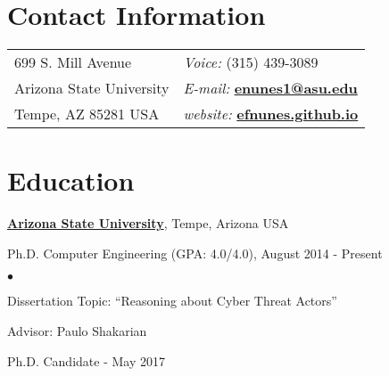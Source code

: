 \documentclass[margin,line]{CV}
\newenvironment{list1}{
  \begin{list}{\ding{113}}{%
      \setlength{\itemsep}{0in}
      \setlength{\parsep}{0in} \setlength{\parskip}{0in}
      \setlength{\topsep}{0in} \setlength{\partopsep}{0in} 
      \setlength{\leftmargin}{0.17in}}}{\end{list}}
\newenvironment{list2}{
  \begin{list}{$\bullet$}{%
      \setlength{\itemsep}{0in}
      \setlength{\parsep}{0in} \setlength{\parskip}{0in}
      \setlength{\topsep}{0in} \setlength{\partopsep}{0in} 
      \setlength{\leftmargin}{0.2in}}}{\end{list}}
\begin{document}

\begin{resume}
\section{\sc Contact Information}
\vspace{.05in}
\begin{tabular}{@{}p{2in}p{4in}}
699 S. Mill Avenue            & {\it Voice:}  (315) 439-3089\\                    
Arizona State University & {\it E-mail:}  \href{mailto:enunes1@asu.edu}{\bf enunes1@asu.edu}\\       
Tempe, AZ  85281 USA  & {\it website:} \href{https://efnunes.github.io/}{\bf efnunes.github.io} \\     
\end{tabular}



\section{\sc Education}
\href{http://www.asu.edu/}{\bf Arizona State University}, Tempe, Arizona USA\\
\vspace*{-.1in}
\begin{list1}
\item[] Ph.D. Computer Engineering (GPA: 4.0/4.0), August 2014 - Present
\begin{list2}
\vspace*{.05in}
\item Dissertation Topic:  ``Reasoning about Cyber Threat Actors'' 
\item Advisor:  Paulo Shakarian
\item Ph.D. Candidate - May 2017
\end{list2}
\end{list1}


\end{resume}
\end{document}
